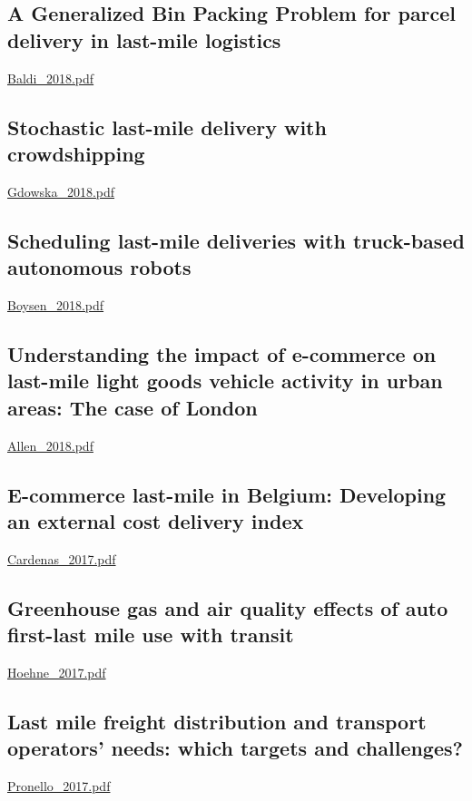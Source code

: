 \subsection{A Generalized Bin Packing Problem for parcel delivery in last-mile logistics}

\url{Baldi_2018.pdf}\cite{Baldi_2018}

\subsection{Stochastic last-mile delivery with crowdshipping}

\url{Gdowska_2018.pdf}\cite{Gdowska_2018}

\subsection{Scheduling last-mile deliveries with truck-based autonomous robots}

\url{Boysen_2018.pdf}\cite{Boysen_2018}

\subsection{Understanding the impact of e-commerce on last-mile light goods vehicle activity in urban areas: The case of London}

\url{Allen_2018.pdf}\cite{Allen_2018}

\subsection{E-commerce last-mile in Belgium: Developing an external cost delivery index}

\url{Cardenas_2017.pdf}\cite{Cardenas_2017}

\subsection{Greenhouse gas and air quality effects of auto first-last mile use with transit}

\url{Hoehne_2017.pdf}\cite{Hoehne_2017}

\subsection{Last mile freight distribution and transport operators’ needs: which targets and challenges?}

\url{Pronello_2017.pdf}\cite{Pronello_2017}

